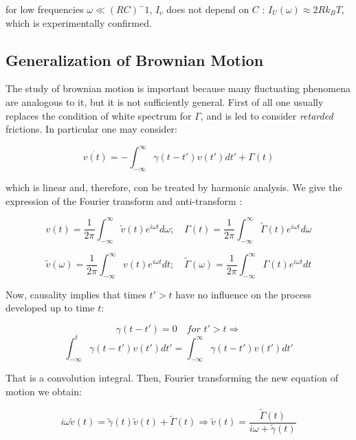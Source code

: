 \documentclass{article}
\begin{document}
for low frequencies $\omega \ll (RC)^-1$, $I_v$ does not depend on $C$ : $I_U(\omega) \approx 2 R k_B T $, which is experimentally confirmed.

\subsection{Generalization of Brownian Motion}
The study of brownian motion is important because many fluctuating phenomena are analogous to it, but it is not sufficiently general. First of all one usually replaces the condition of white spectrum for $\Gamma$, and is led to consider \textit{retarded} frictions. In particular one may consider:

\begin{equation}
\dot{v(t)} = - \int_{- \infty}^{ \infty } \gamma(t-t') v(t') dt' + \Gamma(t)
\end{equation}

which is linear and, therefore, con be treated by harmonic analysis. We give the expression of the Fourier transform and anti-transform : 

\begin{equation}
v(t) = \frac{1}{2 \pi} \int_{- \infty}^{ \infty } \widetilde{v}(t) e^{i \omega t} d \omega ; \quad \Gamma(t) = \frac{1}{2 \pi} \int_{- \infty}^{ \infty } \widetilde{\Gamma}(t) e^{i \omega t} d \omega	
\end{equation}

\begin{equation}
\widetilde{v}(\omega) = \frac{1}{2 \pi} \int_{- \infty}^{ \infty } v(t) e^{i \omega t} dt ; \quad \widetilde{\Gamma}(\omega) = \frac{1}{2 \pi} \int_{- \infty}^{ \infty } \Gamma(t) e^{i \omega t} dt	
\end{equation}

Now, causality implies that times $t' > t$ have no influence on the process developed up to time $t$:

$$\gamma(t-t') = 0 \quad \textit{for $t'>t$} \Rightarrow $$
$$ \int_{- \infty}^{ t }  \gamma(t-t') v(t') dt' = \int_{- \infty}^{ \infty }  \gamma(t-t') v(t') dt'$$
 
 That is a convolution integral. Then, Fourier transforming the new equation of motion we obtain:
 
 \begin{equation}
  i \omega \widetilde{v}(t) = \widetilde{\gamma}(t) \widetilde{v}(t) + \widetilde{\Gamma}(t) \Rightarrow \widetilde{v}(t) = \frac{\widetilde{\Gamma}(t)}{i \omega +  \widetilde{\gamma}(t)} \label{oneast}
 \end{equation}
\end{document}
